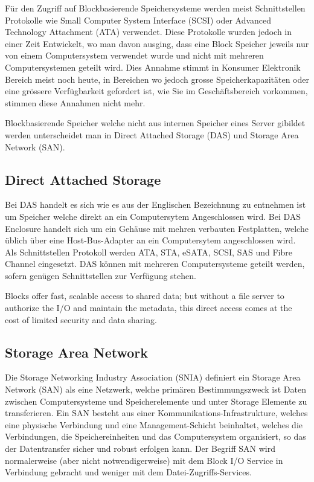 Für den Zugriff auf Blockbasierende Speichersysteme werden meist Schnittstellen Protokolle wie Small Computer System Interface (SCSI) oder Advanced Technology Attachment (ATA) verwendet. Diese Protokolle wurden jedoch in einer Zeit Entwickelt, wo man davon ausging, dass eine Block Speicher jeweils nur von einem Computersystem verwendet wurde und nicht mit mehreren Computersystemen geteilt wird. Dies Annahme stimmt in Konsumer Elektronik Bereich meist noch heute, in Bereichen wo jedoch grosse Speicherkapazitäten oder eine grössere Verfügbarkeit gefordert ist, wie Sie im Geschäftsbereich vorkommen, stimmen diese Annahmen nicht mehr.

Blockbasierende Speicher welche nicht aus internen Speicher eines Server gibildet werden unterscheidet man in Direct Attached Storage (DAS) und Storage Area Network (SAN). 

\subsection{Direct Attached Storage}
Bei DAS handelt es sich wie es aus der Englischen Bezeichnung zu entnehmen ist um Speicher welche direkt an ein Computersytem Angeschlossen wird. Bei DAS Enclosure handelt sich um ein Gehäuse mit mehren verbauten Festplatten, welche üblich über eine Host-Bus-Adapter an ein Computersytem angeschlossen wird. Als Schnittstellen Protokoll werden ATA, STA, eSATA, SCSI, SAS und Fibre Channel eingesetzt. DAS können mit mehreren Computersysteme geteilt werden, sofern genügen Schnittstellen zur Verfügung stehen.


Blocks offer fast, scalable access to shared data; but without a file server to authorize the I/O and maintain the metadata, this direct access comes at the cost of limited security and data sharing.


\subsection{Storage Area Network}
Die Storage Networking Industry Association (SNIA) definiert ein Storage Area Network (SAN) als eine Netzwerk, welche primären Bestimmungszweck ist Daten zwischen Computersysteme und Speicherelemente und unter Storage Elemente zu transferieren. Ein SAN besteht aus einer Kommunikations-Infrastrukture, welches eine physische Verbindung und eine Management-Schicht beinhaltet, welches die Verbindungen, die Speichereinheiten und das Computersystem organisiert, so das der Datentransfer sicher und robust erfolgen kann. Der Begriff SAN wird normalerweise (aber nicht notwendigerweise) mit dem Block I/O Service in Verbindung gebracht und weniger mit dem Datei-Zugriffs-Services.\cite{SNIA2011}

